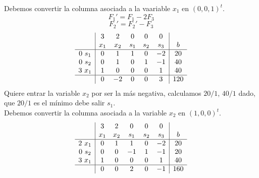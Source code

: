 \documentclass[11pt,fleqn]{book} %
\begin{document}
Debemos convertir la columna asociada a la vaariable $x_1$ en $(0, 0, 1)^t$.
$$F_1'=F_1-2F_3$$
$$F_2'=F_2'-F_3$$
$$
\begin{array}{c|ccccc|c}
& 3 & 2 & 0 & 0 & 0 & \\
& x_1 & x_2 & s_1 & s_2 & s_3 & b \\ \hline
0 ~s_1 & 0 & 1 & 1 & 0 &-2 & 20 \\
0~ s_2 & 0 & 1 & 0 & 1 & -1 & 40 \\
3 ~x_1 & 1 & 0 & 0 & 0 & 1 & 40 \\ \hline 
& 0 & -2 & 0 & 0 & 3 & 120
\end{array}
$$
Quiere entrar la variable $x_2$ por ser la más negativa, calculamos $20/1$, $40/1$ dado, que $20/1$ es el mínimo debe salir $s_1$. \\
Debemos convertir la columna asociada a la variable $x_2$ en $(1, 0, 0)^t$.
$$
\begin{array}{c|ccccc|c}
& 3 & 2 & 0 & 0 & 0 & \\
& x_1 & x_2 & s_1 & s_2 & s_3 & b \\ \hline
2 ~x_1 & 0 & 1 & 1 & 0 &-2 & 20 \\
0~ s_2 & 0 & 0 & -1 & 1 & -1 & 20 \\
3 ~x_1 & 1 & 0 & 0 & 0 & 1 & 40 \\ \hline 
& 0 & 0 & 2 & 0 & -1 & 160
\end{array}
$$
\end{document}
